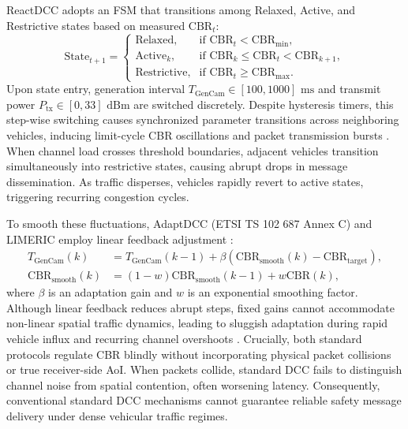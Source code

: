\documentclass[journal]{IEEEtran}
\begin{document}
ReactDCC \cite{ETSI_TS_103_175} adopts an FSM that transitions among Relaxed, Active, and Restrictive states based on measured $\text{CBR}_t$:
\begin{equation}
\label{eq:react_dcc}
\text{State}_{t+1} = \begin{cases} 
\text{Relaxed}, & \text{if } \text{CBR}_t < \text{CBR}_{\text{min}}, \\ 
\text{Active}_k, & \text{if } \text{CBR}_k \le \text{CBR}_t < \text{CBR}_{k+1}, \\ 
\text{Restrictive}, & \text{if } \text{CBR}_t \ge \text{CBR}_{\text{max}}. 
\end{cases}
\end{equation}
Upon state entry, generation interval $T_{\text{GenCam}} \in [100, 1000]\text{ ms}$ and transmit power $P_{\text{tx}} \in [0, 33]\text{ dBm}$ are switched discretely. Despite hysteresis timers, this step-wise switching causes synchronized parameter transitions across neighboring vehicles, inducing limit-cycle CBR oscillations and packet transmission bursts \cite{Bansal2013LIMERIC}. When channel load crosses threshold boundaries, adjacent vehicles transition simultaneously into restrictive states, causing abrupt drops in message dissemination. As traffic disperses, vehicles rapidly revert to active states, triggering recurring congestion cycles.

To smooth these fluctuations, AdaptDCC (ETSI TS 102 687 Annex C) and LIMERIC employ linear feedback adjustment \cite{Bansal2013LIMERIC}:
\begin{align}
\label{eq:adapt_dcc_t}
T_{\text{GenCam}}(k) &= T_{\text{GenCam}}(k-1) + \beta \left( \text{CBR}_{\text{smooth}}(k) - \text{CBR}_{\text{target}} \right), \\
\label{eq:adapt_dcc_cbr}
\text{CBR}_{\text{smooth}}(k) &= (1 - w)\text{CBR}_{\text{smooth}}(k-1) + w\text{CBR}(k),
\end{align}
where $\beta$ is an adaptation gain and $w$ is an exponential smoothing factor. Although linear feedback reduces abrupt steps, fixed gains cannot accommodate non-linear spatial traffic dynamics, leading to sluggish adaptation during rapid vehicle influx and recurring channel overshoots \cite{Zheng2022Age, Ye2019Deep}. Crucially, both standard protocols regulate CBR blindly without incorporating physical packet collisions or true receiver-side AoI. When packets collide, standard DCC fails to distinguish channel noise from spatial contention, often worsening latency. Consequently, conventional standard DCC mechanisms cannot guarantee reliable safety message delivery under dense vehicular traffic regimes.
\end{document}
